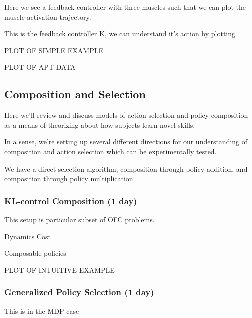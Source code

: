 {            Here we see a feedback controller with three muscles such
            that we can plot the muscle activation trajectory.

            This is the feedback controller K, we can understand it's
            action by plotting

            PLOT OF SIMPLE EXAMPLE

            PLOT OF APT DATA

            \hypertarget{composition-and-selection}{%
            \subsection{Composition and
            Selection}\label{composition-and-selection}}

            Here we'll review and discuss models of action selection and
            policy composition as a means of theorizing about how
            subjects learn novel skills.

            In a sense, we're setting up several different directions
            for our understanding of composition and action selection
            which can be experimentally tested.

            We have a direct selection algorithm, composition through
            policy addition, and composition through policy
            multiplication.

            \hypertarget{kl-control-composition-1-day}{%
            \subsubsection{KL-control Composition (1
            day)}\label{kl-control-composition-1-day}}

            This setup is particular subset of OFC problems.

            Dynamics Cost

            Composable policies

            PLOT OF INTUITIVE EXAMPLE

            \hypertarget{generalized-policy-selection-1-day}{%
            \subsubsection{Generalized Policy Selection (1
            day)}\label{generalized-policy-selection-1-day}}

            This is in the MDP case

}
